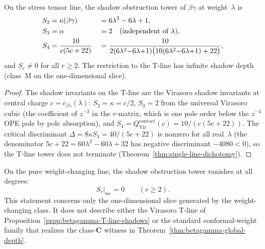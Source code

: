 \begin{proposition}
\label{prop:betagamma-T-line-shadows}
On the stress tensor line, the shadow obstruction tower of $\beta\gamma$ at
weight~$\lambda$ is
\begin{alignat}{2}
 S_2 &= \kappa(\beta\gamma) &&= 6\lambda^2 - 6\lambda + 1,
 \label{eq:bg-S2-Tline} \\
 S_3 &= \alpha &&= 2
 \quad \textup{(independent of~$\lambda$)},
 \label{eq:bg-S3-Tline} \\
 S_4 &= \frac{10}{c(5c+22)}
 &&= \frac{10}{2(6\lambda^2{-}6\lambda{+}1)
 \bigl(10(6\lambda^2{-}6\lambda{+}1)+22\bigr)},
 \label{eq:bg-S4-Tline}
\end{alignat}
and $S_r \neq 0$ for all $r \geq 2$.
The restriction to the T-line has infinite shadow depth
\textup{(}class~M on the one-dimensional slice\textup{)}.
\end{proposition}

\begin{proof}
The shadow invariants on the T-line are the Virasoro shadow invariants
at central charge $c = c_{\beta\gamma}(\lambda)$: $S_2 = \kappa = c/2$,
$S_3 = 2$ from the universal Virasoro cubic (the coefficient of
$z^{-3}$ in the $r$-matrix, which is one pole order below the $z^{-4}$
OPE pole by pole absorption), and $S_4 = Q^{\mathrm{contact}}_{\mathrm{Vir}}(c) =
10/(c(5c+22))$. The critical discriminant
$\Delta = 8\kappa S_4 = 40/(5c+22)$ is nonzero for all real~$\lambda$
(the denominator $5c+22 = 60\lambda^2 - 60\lambda + 32$ has negative
discriminant $-4080 < 0$), so the T-line tower does not terminate
(Theorem~\ref{thm:single-line-dichotomy}).\qedhere
\end{proof}

\begin{proposition}
\label{prop:betagamma-weight-line-shadows}
On the pure weight-changing line, the shadow obstruction tower vanishes at all degrees:
\[
 S_r\big|_{\mathrm{wc}} = 0
 \qquad (r \geq 2).
\]
This statement concerns only the one-dimensional slice generated by the
weight-changing class. It does not describe either the Virasoro T-line
of Proposition~\ref{prop:betagamma-T-line-shadows} or the standard
conformal-weight family that realizes the class-$\mathbf{C}$ witness in
Theorem~\ref{thm:betagamma-global-depth}.
\end{proposition}

